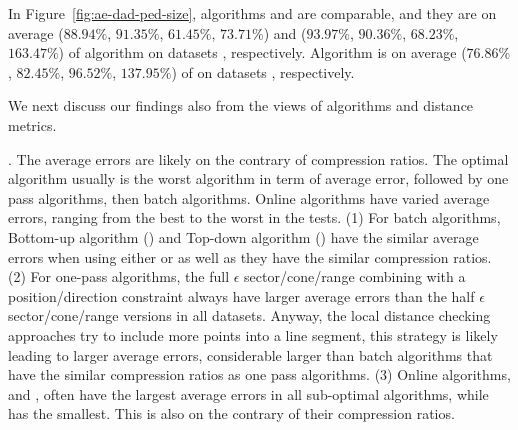 %
In Figure~\ref{fig:ae-dad-ped-size}, algorithms \tpa and \interval are comparable, and they are on average
{($88.94\%$, $91.35\%$, $61.45\%$, $73.71\%$) and ($93.97\%$, $90.36\%$, $68.23\%$, $163.47\%$)} of algorithm \opt on datasets \dSets, respectively.
Algorithm \dpa is on average ($76.86\%$, $82.45\%$, $96.52\%$, $137.95\%$) of \opt on datasets \dSets, respectively.



We next discuss our findings also from the views of \lsa algorithms and distance metrics.

. The average errors are likely on the contrary of compression ratios. The optimal algorithm usually is the worst algorithm in term of average error, followed by one pass algorithms, then batch algorithms. Online algorithms have varied average errors, ranging from the best to the worst in the tests.
(1) For batch algorithms, Bottom-up algorithm (\tpa) and Top-down algorithm (\dpa) have the similar average errors when using either \ped or \sed as well as they have the similar compression ratios. \todo{\dad}
%
(2) For one-pass algorithms, the full $\epsilon$ sector/cone/range combining with a position/direction constraint always have larger average errors than the half $\epsilon$ sector/cone/range versions in all datasets. Anyway, the local distance checking approaches try to include more points into a line segment, this strategy is likely leading to larger average errors, considerable larger than batch algorithms that have the similar compression ratios as one pass algorithms.
%
(3) Online algorithms, \bqsa and \opwa, often have the largest average errors in all sub-optimal algorithms, while \squishe has the smallest. This is also on the contrary of their compression ratios.



